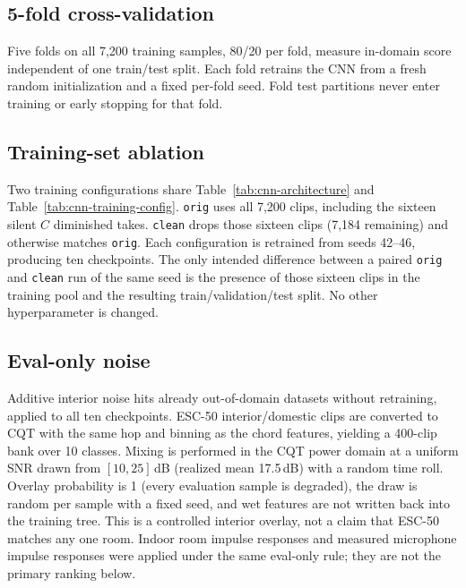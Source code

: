\documentclass[pdflatex,sn-mathphys-num,iicol]{sn-jnl}
\theoremstyle{thmstyleone}
\theoremstyle{thmstyletwo}
\theoremstyle{thmstylethree}
\begin{document}
\subsection{5-fold cross-validation}\label{subsec3_5}

Five folds on all 7{,}200 training samples, 80/20 per fold, measure in-domain score independent of one train/test split. Each fold retrains the CNN from a fresh random initialization and a fixed per-fold seed. Fold test partitions never enter training or early stopping for that fold.

\subsection{Training-set ablation}\label{subsec3_variants}

Two training configurations share Table~\ref{tab:cnn-architecture} and Table~\ref{tab:cnn-training-config}. \texttt{orig} uses all 7{,}200 clips, including the sixteen silent $C$ diminished takes. \texttt{clean} drops those sixteen clips (7{,}184 remaining) and otherwise matches \texttt{orig}. Each configuration is retrained from seeds 42--46, producing ten checkpoints. The only intended difference between a paired \texttt{orig} and \texttt{clean} run of the same seed is the presence of those sixteen clips in the training pool and the resulting train/validation/test split. No other hyperparameter is changed.

\subsection{Eval-only noise}\label{subsec3_7}

Additive interior noise hits already out-of-domain datasets without retraining, applied to all ten checkpoints. ESC-50 interior/domestic clips \cite{Piczak2015} are converted to CQT with the same hop and binning as the chord features, yielding a 400-clip bank over 10 classes. Mixing is performed in the CQT power domain at a uniform SNR drawn from $[10, 25]$\,dB (realized mean 17.5\,dB) with a random time roll. Overlay probability is 1 (every evaluation sample is degraded), the draw is random per sample with a fixed seed, and wet features are not written back into the training tree. This is a controlled interior overlay, not a claim that ESC-50 matches any one room. Indoor room impulse responses and measured microphone impulse responses were applied under the same eval-only rule; they are not the primary ranking below.
\end{document}
